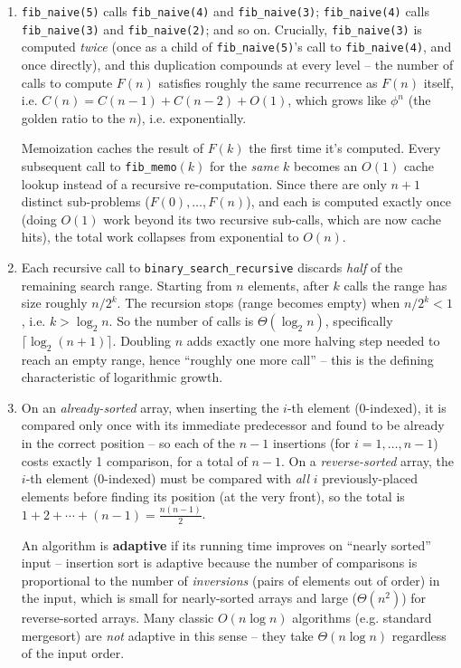 \documentclass[11pt]{article}
\begin{document}
\begin{enumerate}[label=\textbf{A\arabic*.}, leftmargin=2.2em]
\item \texttt{fib\_naive(5)} calls \texttt{fib\_naive(4)} and \texttt{fib\_naive(3)};
\texttt{fib\_naive(4)} calls \texttt{fib\_naive(3)} and \texttt{fib\_naive(2)}; and so on.
Crucially, \texttt{fib\_naive(3)} is computed \emph{twice} (once as a child of
\texttt{fib\_naive(5)}'s call to \texttt{fib\_naive(4)}, and once directly), and this
duplication compounds at every level -- the number of calls to compute $F(n)$ satisfies
roughly the same recurrence as $F(n)$ itself, i.e. $C(n) = C(n-1) + C(n-2) + O(1)$, which
grows like $\phi^n$ (the golden ratio to the $n$), i.e. exponentially.

Memoization caches the result of $F(k)$ the first time it's computed. Every subsequent
call to \texttt{fib\_memo}$(k)$ for the \emph{same} $k$ becomes an $O(1)$ cache lookup
instead of a recursive re-computation. Since there are only $n+1$ distinct sub-problems
($F(0), \ldots, F(n)$), and each is computed exactly once (doing $O(1)$ work beyond its
two recursive sub-calls, which are now cache hits), the total work collapses from
exponential to $O(n)$.

\item Each recursive call to \texttt{binary\_search\_recursive} discards \emph{half} of
the remaining search range. Starting from $n$ elements, after $k$ calls the range has
size roughly $n / 2^k$. The recursion stops (range becomes empty) when $n/2^k < 1$, i.e.
$k > \log_2 n$. So the number of calls is $\Theta(\log_2 n)$, specifically
$\lceil \log_2(n+1) \rceil$. Doubling $n$ adds exactly one more halving step needed to
reach an empty range, hence ``roughly one more call'' -- this is the defining
characteristic of logarithmic growth.

\item On an \emph{already-sorted} array, when inserting the $i$-th element (0-indexed),
it is compared only once with its immediate predecessor and found to be already in the
correct position -- so each of the $n-1$ insertions (for $i=1,\ldots,n-1$) costs exactly 1
comparison, for a total of $n-1$. On a \emph{reverse-sorted} array, the $i$-th element
(0-indexed) must be compared with \emph{all} $i$ previously-placed elements before
finding its position (at the very front), so the total is
$1+2+\cdots+(n-1) = \frac{n(n-1)}{2}$.

An algorithm is \textbf{adaptive} if its running time improves on ``nearly sorted'' input
-- insertion sort is adaptive because the number of comparisons is proportional to the
number of \emph{inversions} (pairs of elements out of order) in the input, which is small
for nearly-sorted arrays and large ($\Theta(n^2)$) for reverse-sorted arrays. Many
classic $O(n\log n)$ algorithms (e.g. standard mergesort) are \emph{not} adaptive in this
sense -- they take $\Theta(n\log n)$ regardless of the input order.


\end{enumerate}
\end{document}

